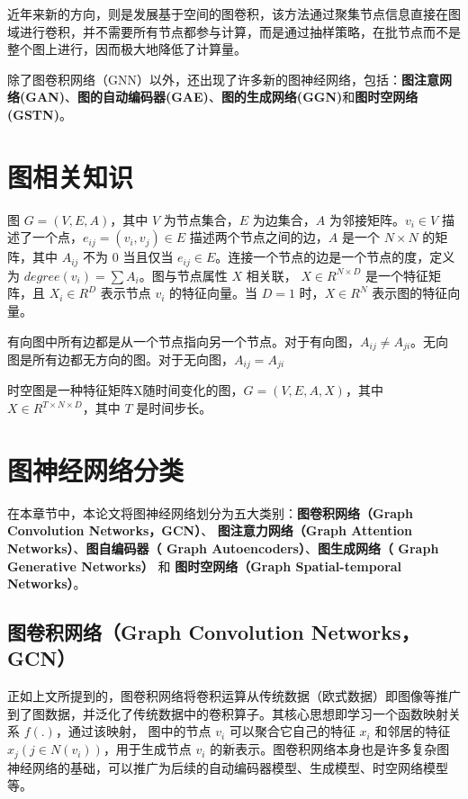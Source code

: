 \documentclass[UTF8]{ctexart}
\begin{document}
近年来新的方向，则是发展基于空间的图卷积，该方法通过聚集节点信息直接在图域进行卷积，并不需要所有节点都参与计算，而是通过抽样策略，在批节点而不是整个图上进行，因而极大地降低了计算量。

除了图卷积网络（GNN）以外，还出现了许多新的图神经网络，包括：\textbf{图注意网络(GAN)}、\textbf{图的自动编码器(GAE)}、\textbf{图的生成网络(GGN)}和\textbf{图时空网络(GSTN)}。

\section{图相关知识}

图 $G=(V,E,A)$，其中 $V$ 为节点集合，$E$ 为边集合，$A$ 为邻接矩阵。$v_i \in V$ 描述了一个点，$e_{ij}=(v_i,v_j) \in E$ 描述两个节点之间的边，$A$ 是一个 $N \times N$ 的矩阵，其中 $A_{ij}$ 不为 $0$ 当且仅当 $e_{ij} \in E$。连接一个节点的边是一个节点的度，定义为 $degree(v_i)=\sum A_i$。图与节点属性 $X$ 相关联， $X \in R^{N \times D}$ 是一个特征矩阵，且 $X_i \in R^D$ 表示节点 $v_i$ 的特征向量。当 $D=1$ 时，$X \in R^N$ 表示图的特征向量。 \par
有向图中所有边都是从一个节点指向另一个节点。对于有向图，$A_{ij} \ne A_{ji}$。无向图是所有边都无方向的图。对于无向图，$A_{ij} = A_{ji}$ \par
时空图是一种特征矩阵X随时间变化的图，$G=(V,E,A,X)$，其中 $X \in R^{T \times N \times D}$，其中 $T$ 是时间步长。

\section{图神经网络分类}

在本章节中，本论文将图神经网络划分为五大类别：\textbf{图卷积网络（Graph Convolution Networks，GCN）}、 \textbf{图注意力网络（Graph Attention Networks）}、\textbf{图自编码器（ Graph Autoencoders）}、\textbf{图生成网络（ Graph Generative Networks）} 和 \textbf{图时空网络（Graph Spatial-temporal Networks）}。

\subsection{图卷积网络（Graph Convolution Networks，GCN）}

正如上文所提到的，图卷积网络将卷积运算从传统数据（欧式数据）即图像等推广到了图数据，并泛化了传统数据中的卷积算子。其核心思想即学习一个函数映射关系 $f(.)$，通过该映射， 图中的节点 $v_i$ 可以聚合它自己的特征 $x_i$ 和邻居的特征 $x_j(j \in N(v_i))$，用于生成节点 $v_i$ 的新表示。图卷积网络本身也是许多复杂图神经网络的基础，可以推广为后续的自动编码器模型、生成模型、时空网络模型等。
\end{document}
